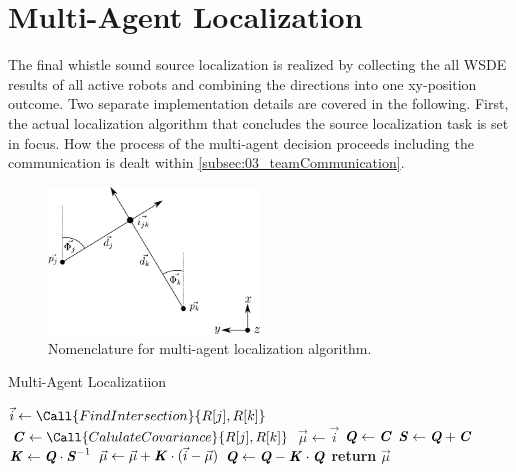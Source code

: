 \section{Multi-Agent Localization}
\label{sec:03_multiAgentLoca}

The final whistle sound source localization is realized by collecting the
all \ac{WSDE} results of all active robots and combining the directions
into one xy-position outcome.
Two separate implementation details are covered in the following.
First, the actual localization algorithm that concludes the source localization
task is set in focus.
How the process of the multi-agent decision proceeds including the communication
is dealt within \cref{subsec:03_teamCommunication}.


\begin{figure}[ht]
	\centering
		\includegraphics[width=0.50\textwidth]{figures/rays}
    \caption[Nomenclature for multi-agent localization algorithm]
            {Nomenclature for multi-agent localization algorithm.}
    \label{fig:03_rays}
\end{figure}


\begin{algorithm}[H]
    \caption{Multi-Agent Localizatiion}\label{alg:multiAgentLoca}
    \begin{algorithmic}[1]
                    \State $\vec{i} \gets \Call{FindIntersection}{R[j], R[k]}$
                    \State $\textbf{\textit{C}} \gets \Call{CalulateCovariance}{R[j], R[k]}$
                        \State $\vec{\mu} \gets \vec{i}$
                        \State $\textbf{\textit{Q}} \gets \textbf{\textit{C}}$
                        \State $\textbf{\textit{S}} \gets \textbf{\textit{Q}} + \textbf{\textit{C}}$
                        \State $\textbf{\textit{K}} \gets \textbf{\textit{Q}} \cdot \textbf{\textit{S}}^{-1}$
                        \State $\vec{\mu} \gets \vec{\mu} + \textbf{\textit{K}} \cdot (\vec{i} - \vec{\mu})$
                        \State $\textbf{\textit{Q}} \gets \textbf{\textit{Q}} - \textbf{\textit{K}} \cdot \textbf{\textit{Q}}$
                    \EndIf
                \EndFor
            \EndFor
            \State \textbf{return} $\vec{\mu}$
        \EndProcedure\vspace{12pt}
    \end{algorithmic}
\end{algorithm}


